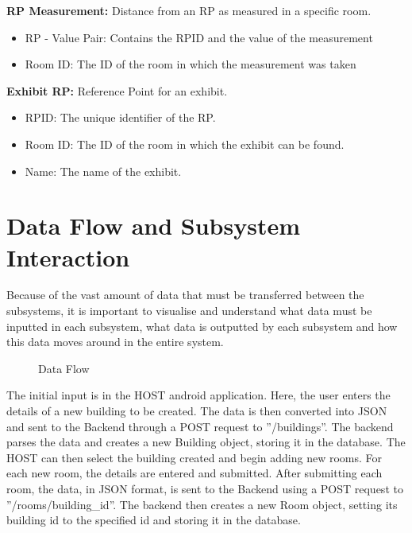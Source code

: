 \textbf{RP Measurement:} Distance from an RP as measured in a specific room.
\begin{itemize}
	\item RP - Value Pair: Contains the RPID and the value of the measurement
	\item Room ID: The ID of the room in which the measurement was taken
\end{itemize}

\textbf{Exhibit RP:} Reference Point for an exhibit.
\begin{itemize}
	\item RPID: The unique identifier of the RP.
	\item Room ID: The ID of the room in which the exhibit can be found.
	\item Name: The name of the exhibit.
\end{itemize}

\section{Data Flow and Subsystem Interaction}
Because of the vast amount of data that must be transferred between the subsystems, it is important to visualise and understand what data must be inputted in each subsystem, what data is outputted by each subsystem and how this data moves around in the entire system.
\begin{figure}
\noindent{}
\caption{Data Flow}
\end{figure}
The initial input is in the HOST android application. Here, the user enters the details of a new building to be created. The data is then converted into JSON and sent to the Backend through a POST request to ”/buildings”. The backend parses the data and creates a new Building object, storing it in the database. The HOST can then select the building created and begin adding new rooms. For each new room, the details are entered and submitted. After submitting each room, the data, in JSON format, is sent to the Backend using a POST request to ”/rooms/building\_id”. The backend then creates a new Room object, setting its building id to the specified id and storing it in the database.

